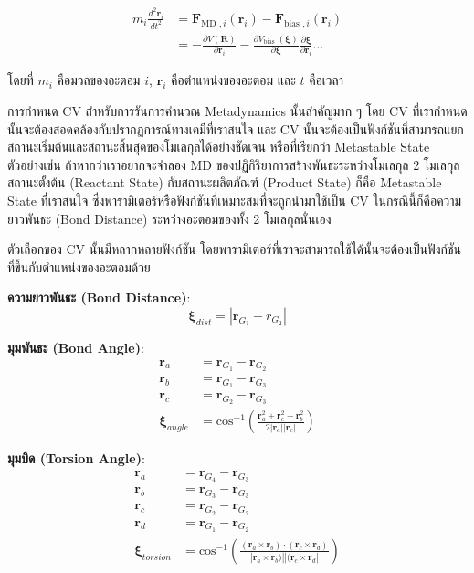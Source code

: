 \begin{align}
  m_i \frac{d^2 \mathbf{r}_i}{d t^2}
   & =
  \mathbf{F}_{\text{MD }, i}\left(\mathbf{r}_i\right)-\mathbf{F}_{\text{bias }, i}\left(\mathbf{r}_i\right) \\
   & =
  -\frac{\partial V(\mathbf{R})}{\partial \mathbf{r}_i}
  -\frac{\partial V_{\text{bias }}(\boldsymbol{\xi})}{\partial \boldsymbol{\xi}}
  \frac{\partial \boldsymbol{\xi}}{\partial \mathbf{r}_i} \ldots
\end{align}

\noindent โดยที่ $m_i$ คือมวลของอะตอม $i$, $\mathbf{r}_i$ คือตำแหน่งของอะตอม และ $t$ คือเวลา

การกำหนด CV สำหรับการรันการคำนวณ Metadynamics นั้นสำคัญมาก ๆ โดย CV ที่เรากำหนดนั้นจะต้องสอดคล้องกับปรากฏการณ์ทางเคมีที่เราสนใจ
และ CV นั้นจะต้องเป็นฟังก์ชันที่สามารถแยกสถานะเริ่มต้นและสถานะสิ้นสุดของโมเลกุลได้อย่างชัดเจน หรือที่เรียกว่า Metastable State ตัวอย่างเช่น
ถ้าหากว่าเราอยากจะจำลอง MD ของปฏิกิริยาการสร้างพันธะระหว่างโมเลกุล 2 โมเลกุล สถานะตั้งต้น (Reactant State) กับสถานะผลิตภัณฑ์
(Product State) ก็คือ Metastable State ที่เราสนใจ ซึ่งพารามิเตอร์หรือฟังก์ชันที่เหมาะสมที่จะถูกนำมาใช้เป็น CV ในกรณีนี้ก็คือความยาวพันธะ
(Bond Distance) ระหว่างอะตอมของทั้ง 2 โมเลกุลนั่นเอง

ตัวเลือกของ CV นั้นมีหลากหลายฟังก์ชัน โดยพารามิเตอร์ที่เราจะสามารถใช้ได้นั้นจะต้องเป็นฟังก์ชันที่ขึ้นกับตำแหน่งของอะตอมด้วย

\noindent \textbf{ความยาวพันธะ (Bond Distance)}:
\begin{equation}
  \boldsymbol{\xi}_{dist} = |\mathbf{r}_{G_{1}} - {r}_{G_{2}}|
\end{equation}

\noindent \textbf{มุมพันธะ (Bond Angle)}:
\begin{align*}
  \mathbf{r}_{a} &= \mathbf{r}_{G_{1}} - \mathbf{r}_{G_{2}} \\
  \mathbf{r}_{b} &= \mathbf{r}_{G_{1}} - \mathbf{r}_{G_{3}} \\
  \mathbf{r}_{c} &= \mathbf{r}_{G_{2}} - \mathbf{r}_{G_{3}} \\
  \boldsymbol{\xi}_{angle} 
  &= 
  \text{cos}^{-1} \left( \frac{\mathbf{r}^2_{a} 
    + \mathbf{r}^2_{c} 
    - \mathbf{r}^2_{b}}{2|\mathbf{r}_{a}||\mathbf{r}_{c}|} \right)
\end{align*}

\noindent \textbf{มุมบิด (Torsion Angle)}:
\begin{align*}
  \mathbf{r}_{a} &= \mathbf{r}_{G_{4}} - \mathbf{r}_{G_{3}} \\
  \mathbf{r}_{b} &= \mathbf{r}_{G_{3}} - \mathbf{r}_{G_{3}} \\
  \mathbf{r}_{c} &= \mathbf{r}_{G_{2}} - \mathbf{r}_{G_{2}} \\
  \mathbf{r}_{d} &= \mathbf{r}_{G_{1}} - \mathbf{r}_{G_{2}} \\
  \boldsymbol{\xi}_{torsion} 
  &= 
  \text{cos}^{-1} \left( 
    \frac{(\mathbf{r}_{a} \times \mathbf{r}_{b}) 
      \cdot (\mathbf{r}_{c} \times \mathbf{r}_{d}) }{ 
        |\mathbf{r}_{a} \times \mathbf{r}_{b}) 
          || (\mathbf{r}_{c} \times \mathbf{r}_{d}| } \right)
\end{align*}

